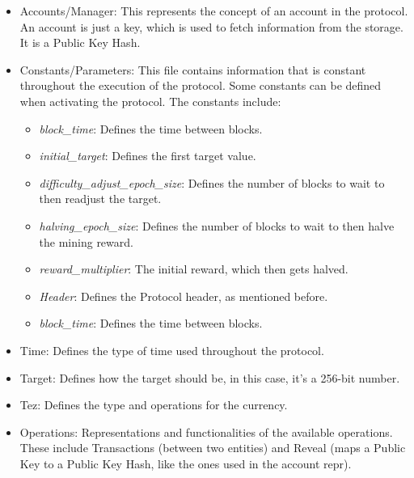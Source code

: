\begin{itemize}

    \item Accounts/Manager: This represents the concept of an account in the protocol. An account is just a key, which is used to fetch information from the storage. It is a Public Key Hash.

    \item Constants/Parameters: This file contains information that is constant throughout the execution of the protocol. Some constants can be defined when activating the protocol. The constants include:

        \begin{itemize}
            \item \emph{block\_time}: Defines the time between blocks.
            \item \emph{initial\_target}: Defines the first target value.
            \item \emph{difficulty\_adjust\_epoch\_size}: Defines the number of blocks to wait to then readjust the target.
            \item \emph{halving\_epoch\_size}: Defines the number of blocks to wait to then halve the mining reward.
            \item \emph{reward\_multiplier}: The initial reward, which then gets halved.
            \item \emph{Header}: Defines the Protocol header, as mentioned before.
            \item \emph{block\_time}: Defines the time between blocks.
        \end{itemize}

    \item Time: Defines the type of time used throughout the protocol.

    \item Target: Defines how the target should be, in this case, it's a 256-bit number.

    \item Tez: Defines the type and operations for the currency.

    \item Operations: Representations and functionalities of the available operations. These include Transactions (between two entities) and Reveal (maps a Public Key to a Public Key Hash, like the ones used in the account repr).

\end{itemize}

